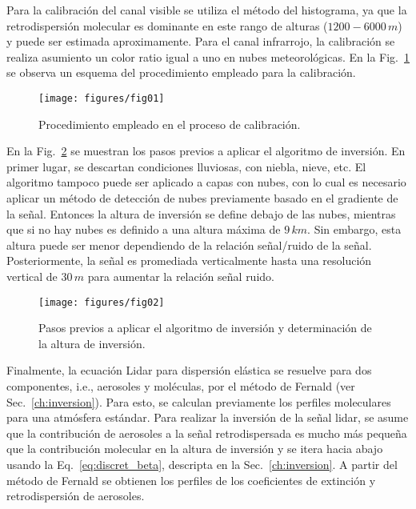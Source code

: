 \documentclass[12pt,a4paper,final]{report}
\begin{document}
	Para la calibración del canal visible se utiliza el método del histograma, ya que la retrodispersión molecular es dominante en este rango de alturas ($1200-6000 \, m$) y puede ser  estimada aproximamente. Para el canal infrarrojo, la calibración se realiza asumiento un color ratio igual a uno en nubes meteorológicas. En la Fig.~\ref{fig:scheme1} se observa un esquema del procedimiento empleado para la calibración.
	
	\begin{figure}[t]
		\begin{center}
			\texttt{[image: figures/fig01]}
		\end{center}
		\caption{
			Procedimiento empleado en el proceso de calibración.
		}
		\label{fig:scheme1}
	\end{figure}
	
	En la Fig.~\ref{fig:scheme2} se muestran los pasos previos a aplicar el algoritmo de inversión. En primer lugar, se descartan condiciones lluviosas, con niebla, nieve, etc. El algoritmo tampoco puede ser aplicado a capas con nubes, con lo cual es necesario aplicar un método de detección de nubes previamente basado en el gradiente de la señal. Entonces la altura de inversión se define debajo de las nubes, mientras que si no hay nubes es definido a una altura máxima de $9 \, km$. Sin embargo, esta altura puede ser menor dependiendo de la relación señal/ruido de la señal. Posteriormente, la señal es promediada verticalmente hasta una resolución vertical de $30\,m$ para aumentar la relación señal ruido.
	
	\begin{figure}[t]
		\begin{center}
			\texttt{[image: figures/fig02]}
		\end{center}
		\caption{
			Pasos previos a aplicar el algoritmo de inversión y determinación de la altura de inversión.
		}
		\label{fig:scheme2}
	\end{figure}
	
	Finalmente, la ecuación Lidar para dispersión elástica se resuelve para dos componentes, i.e., aerosoles y moléculas, por el método de Fernald (ver Sec.~\ref{ch:inversion}). Para esto, se calculan previamente los perfiles moleculares para una atmósfera estándar. Para realizar la inversión de la señal lidar, se asume que la contribución de aerosoles a la señal retrodispersada es mucho más pequeña que la contribución molecular en la altura de inversión y se itera hacia abajo usando la Eq.~\ref{eq:discret_beta}, descripta en la Sec.~\ref{ch:inversion}. A partir del método de Fernald se obtienen los perfiles de los coeficientes de extinción y retrodispersión de aerosoles.
	
\end{document}

